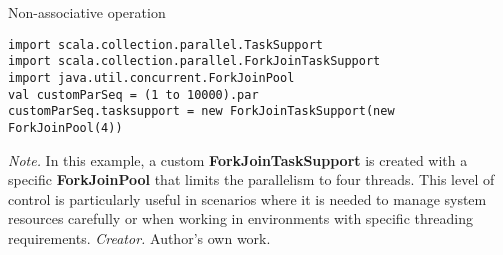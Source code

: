 \begin{table}[h!]
\caption{Non-associative operation}
\begin{lstlisting}
import scala.collection.parallel.TaskSupport
import scala.collection.parallel.ForkJoinTaskSupport
import java.util.concurrent.ForkJoinPool
val customParSeq = (1 to 10000).par
customParSeq.tasksupport = new ForkJoinTaskSupport(new ForkJoinPool(4))
\end{lstlisting}
\small
\textit{Note.} In this example, a custom \textbf{ForkJoinTaskSupport} is created with a specific \textbf{ForkJoinPool} that limits the parallelism to four threads. This level of control is particularly useful in scenarios where it is needed to manage system resources carefully or when working in environments with specific threading requirements.
\textit{Creator.} Author's own work.
\end{table}